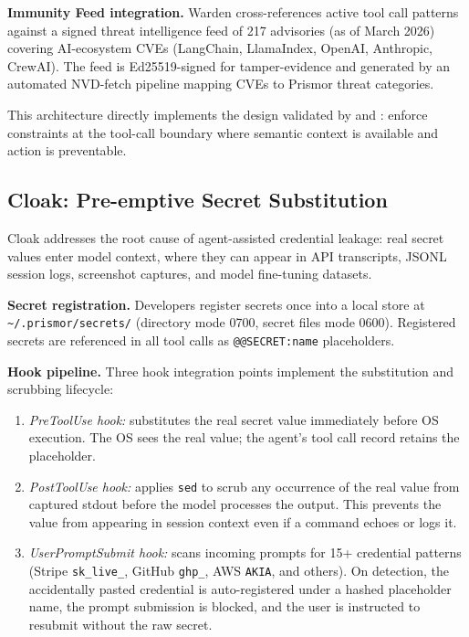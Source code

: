 \documentclass[11pt,letterpaper]{article}
\begin{document}
\textbf{Immunity Feed integration.} Warden cross-references active tool call patterns
against a signed threat intelligence feed of 217 advisories (as of March 2026) covering
AI-ecosystem CVEs (LangChain, LlamaIndex, OpenAI, Anthropic, CrewAI). The feed is
Ed25519-signed for tamper-evidence and generated by an automated NVD-fetch pipeline
mapping CVEs to Prismor threat categories.

This architecture directly implements the design validated by
\citet{zhao2026clawguard} and \citet{wang2026agentspec}: enforce constraints at the
tool-call boundary where semantic context is available and action is preventable.

\subsection{Cloak: Pre-emptive Secret Substitution}

Cloak addresses the root cause of agent-assisted credential leakage: real secret values
enter model context, where they can appear in API transcripts, JSONL session logs,
screenshot captures, and model fine-tuning datasets.

\textbf{Secret registration.} Developers register secrets once into a local store at
\texttt{\textasciitilde/.prismor/secrets/} (directory mode 0700, secret files mode 0600).
Registered secrets are referenced in all tool calls as
\texttt{@@SECRET:\textlangle name\textrangle@@} placeholders.

\textbf{Hook pipeline.} Three hook integration points implement the substitution and
scrubbing lifecycle:
\begin{enumerate}[noitemsep,topsep=2pt]
  \item \emph{PreToolUse hook:} substitutes the real secret value immediately before OS
        execution. The OS sees the real value; the agent's tool call record retains the
        placeholder.
  \item \emph{PostToolUse hook:} applies \texttt{sed} to scrub any occurrence of the
        real value from captured stdout before the model processes the output. This
        prevents the value from appearing in session context even if a command echoes
        or logs it.
  \item \emph{UserPromptSubmit hook:} scans incoming prompts for 15+ credential patterns
        (Stripe \texttt{sk\_live\_}, GitHub \texttt{ghp\_}, AWS \texttt{AKIA}, and
        others). On detection, the accidentally pasted credential is auto-registered
        under a hashed placeholder name, the prompt submission is blocked, and the user
        is instructed to resubmit without the raw secret.
\end{enumerate}
\end{document}
